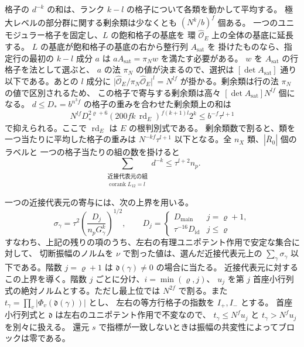格子の \(d^{-k}\) の和は、ランク \(k-l\) の格子について各類を動かして平均する。
極大レベルの部分群に関する剰余類は少なくとも \((N^k/b)^f\) 個ある。
一つのユニモジュラー格子を固定し、\(L\) の飽和格子の基底を
環 \(\widehat{\mathcal O}_E\) 上の全体の基底に延長する。
\(L\) の基底が飽和格子の基底の右から整行列 \(A_{\mathrm{sat}}\) を
掛けたものなら、指定行の最初の \(k-l\) 成分 \(a\) は
\(aA_{\mathrm{sat}}=\pi_N w\) を満たす必要がある。
\(w\) を \(A_{\mathrm{sat}}\) の行格子を法として選ぶと、
\(a\) の法 \(\pi_N\) の値が決まるので、選択は
\([\det A_{\mathrm{sat}}]\) 通り以下である。あとの \(l\) 成分に
\(\bigl|\widehat{\mathcal O}_E/\pi_N\widehat{\mathcal O}_E\bigr|^l=N^{lf}\)
が掛かる。剰余類は行の法 \(\pi_N\) の値で区別されるため、
この格子で寄与する剰余類は高々 \([\det A_{\mathrm{sat}}]N^{lf}\) 個になる。
\(d\le D_\ast=b^{n^3 f}\) の格子の重みを合わせた剰余類上の和は
\[
  N^{lf}D_\ast^{2\varrho+6}
       (200fk\,\operatorname{rd}_E)^{f(k+1)l}2^k
  \le b^{-f}\tau^{l+1}
\]
で抑えられる。ここで \(\operatorname{rd}_E\) は \(E\) の根判別式である。
剰余類数で割ると、類を一つ当たりに平均した格子の重みは
\(N^{-kf}\tau^{l+1}\) 以下となる。全 \(n_X\) 類、\(|\bar R_0|\) 個のラベルと
一つの格子当たりの組の数を掛けると
\begin{equation}\label{eq:span-pair-count}
 \sum_{\substack{\text{近接代表元の組}\\ \operatorname{corank} L_{12}=l}} d^{-k}
 \le \tau^{l+2}n_p .
\end{equation}

一つの近接代表元の寄与には、次の上界を用いる。
\[
 \sigma_\gamma=\tau^2\left(\frac{D_j}{n_pG_\gamma^k}\right)^{1/2},
 \qquad
 D_j=\begin{cases}
       D_{\mathrm{main}} & j=\varrho+1,\\
       \tau^{-16}D_{\mathrm{id}} & j\le\varrho
     \end{cases}
\]
すなわち、上記の残りの項のうち、左右の有理ユニポテント作用で安定な集合に対して、
切断振幅のノルムを \(\nu\) で割った値は、選んだ近接代表元上の \(\sum_\gamma \sigma_\gamma\)
以下である。階数 \(j=\varrho+1\) は \(\mathfrak d(\gamma)\ne0\) の場合に当たる。
近接代表元に対するこの上界を導く。階数 \(j\) ごとに分け、\(i=\min(\varrho,j)\)、
\(u_j\) を第 \(j\) 首座小行列式の絶対ノルムとする。ただし最上位では
\(N^{2f}\) で割る。また
\(t_\gamma=\prod_v|\Phi_v(\mathfrak d(\gamma))|\) とし、
左右の等方行格子の指数を \(I_+,I_-\) とする。
首座小行列式と \(\mathfrak d\) は左右のユニポテント作用で不変なので、
\(t_\gamma\le N^fu_j\) と \(t_\gamma>N^fu_j\) を別々に扱える。
還元 \(s\) で指標が一致しないときは振幅の共変性によってブロックは零である。

